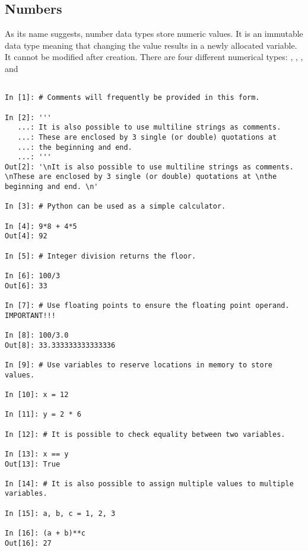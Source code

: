 \subsection*{Numbers}
\begin{example}
As its name suggests, number data types store numeric values. 
It is an immutable data type meaning that changing the value results in a 
newly allocated variable. It cannot be modified after creation. 
There are four different numerical types: , , 
, and 

\begin{lstlisting}

In [1]: # Comments will frequently be provided in this form. 

In [2]: '''
   ...: It is also possible to use multiline strings as comments. 
   ...: These are enclosed by 3 single (or double) quotations at 
   ...: the beginning and end. 
   ...: '''
Out[2]: '\nIt is also possible to use multiline strings as comments. \nThese are enclosed by 3 single (or double) quotations at \nthe beginning and end. \n'

In [3]: # Python can be used as a simple calculator.

In [4]: 9*8 + 4*5
Out[4]: 92

In [5]: # Integer division returns the floor.

In [6]: 100/3
Out[6]: 33

In [7]: # Use floating points to ensure the floating point operand. IMPORTANT!!!

In [8]: 100/3.0
Out[8]: 33.333333333333336

In [9]: # Use variables to reserve locations in memory to store values.

In [10]: x = 12

In [11]: y = 2 * 6

In [12]: # It is possible to check equality between two variables.

In [13]: x == y
Out[13]: True

In [14]: # It is also possible to assign multiple values to multiple variables.

In [15]: a, b, c = 1, 2, 3

In [16]: (a + b)**c
Out[16]: 27

\end{lstlisting}
\end{example}

